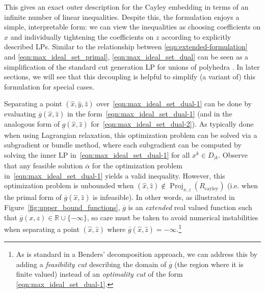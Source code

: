 \documentclass[smallextended]{svjour3}
\newcommand{\blue}[1]{{#1}}
\newcommand{\Proj}{\operatorname{Proj}}
\newcommand{\Rcayley}{R_{\operatorname{cayley}}}
\newcommand{\ubar}[1]{\underline{#1}}
\renewcommand{\bar}[1]{\overline{#1}}
\newcommand{\Authornote}[3]{{\small\textcolor{#2}{\sf$<${  #1: #3}$>$}}}
\newcommand{\jpnote}[1]{\Authornote{JP}{NavyBlue}{#1}}
\begin{document}
This gives an exact outer description for the Cayley embedding in terms of an infinite number of linear inequalities. Despite this, the formulation enjoys a simple, interpretable form: we can view the inequalities as choosing coefficients on $x$ and individually tightening the coefficients on $z$ according to explicitly described LPs. \blue{Similar to the relationship between \eqref{eqn:extended-formulation} and \eqref{eqn:max_ideal_set_primal}, \eqref{eqn:max_ideal_set_dual} can be seen as a simplification of the standard cut generation LP for unions of polyhedra \cite{Balas:1985,Balas:1998}.} In later sections, we will see that this decoupling is helpful to simplify (a variant of) this formulation for special cases.

Separating a point $(\hat{x}, \hat{y}, \hat{z})$ over~\eqref{eqn:max_ideal_set_dual-1} can be done by evaluating $\bar{g}(\hat{x},\hat{z})$ in the form~\eqref{eqn:max_ideal_set_dual-1} (and in the analogous form of $\ubar{g}(\hat{x},\hat{z})$ for~\eqref{eqn:max_ideal_set_dual-2}). As typically done when using Lagrangian relaxation, this optimization problem can be solved via a subgradient or bundle method, where each subgradient can be computed by solving the inner LP in~\eqref{eqn:max_ideal_set_dual-1} for all $x^k \in D_{|k}$. Observe that any feasible solution $\bar{\alpha}$ for the optimization problem in~\eqref{eqn:max_ideal_set_dual-1} yields a valid inequality. However, this optimization problem is unbounded when $(\hat{x}, \hat{z}) \notin \Proj_{x,z}(\Rcayley)$ (i.e. when the primal form of $\bar{g}(\hat{x}, \hat{z})$ is infeasible). In other words, as illustrated in Figure~\ref{fig:upper_bound_functions}, $\bar{g}$ is an \emph{extended} real valued function such that $\bar{g}({x}, {z})\in \mathbb{R}\cup \{-\infty\}$, so care must be taken to avoid numerical instabilities when separating a point $(\hat{x}, \hat{z})$ where $\bar{g}(\hat{x}, \hat{z})=-\infty$.\footnote{As is standard in a Benders' decomposition approach, we can address this by adding a \emph{feasibility cut} describing the domain of $\bar{g}$ (the region where it is finite valued) instead of an \emph{optimality cut} of the form \eqref{eqn:max_ideal_set_dual-1}.}

\end{document}
